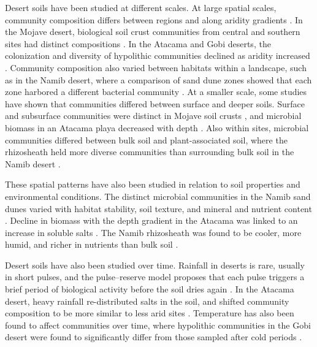 \documentclass[fleqn,10pt,numbers]{olplainarticle}
\begin{document}
Desert soils have been studied at different scales. At large spatial scales, community composition differs between regions and along aridity gradients \cite{neilson2017significant}. In the Mojave desert, biological soil crust communities from central and southern sites had distinct compositions \cite{pombubpa2020mojave}. In the Atacama and Gobi deserts, the colonization and diversity of hypolithic communities declined as aridity increased \cite{warren2006hypolithic, wu2023seasonal}. Community composition also varied between habitats within a landscape, such as in the Namib desert, where a comparison of sand dune zones showed that each zone harbored a different bacterial community \cite{ronca2015namib}. At a smaller scale, some studies have shown that communities differed between surface and deeper soils. Surface and subsurface communities were distinct in Mojave soil crusts \cite{pombubpa2020mojave}, and microbial biomass in an Atacama playa decreased with depth \cite{horstmann2024atacama}. Also within sites, microbial communities differed between bulk soil and plant-associated soil, where the rhizosheath held more diverse communities than surrounding bulk soil in the Namib desert \cite{marasco2022namib}.


These spatial patterns have also been studied in relation to soil properties and environmental conditions. The distinct microbial communities in the Namib sand dunes varied with habitat stability, soil texture, and mineral and nutrient content \cite{ronca2015namib}. Decline in biomass with the depth gradient in the Atacama was linked to an increase in soluble salts \cite{horstmann2024atacama}. The Namib rhizosheath was found to be cooler, more humid, and richer in nutrients than bulk soil \cite{marasco2022namib}.


Desert soils have also been studied over time. Rainfall in deserts is rare, usually in short pulses, and the pulse--reserve model proposes that each pulse triggers a brief period of biological activity before the soil dries again \cite{noymeir1973desert, schwinning2004pulse}. In the Atacama desert, heavy rainfall re-distributed salts in the soil, and shifted community composition to be more similar to less arid sites \cite{shen2021atacama}. Temperature has also been found to affect communities over time, where hypolithic communities in the Gobi desert were found to significantly differ from those sampled after cold periods \cite{wu2023seasonal}.
\end{document}
